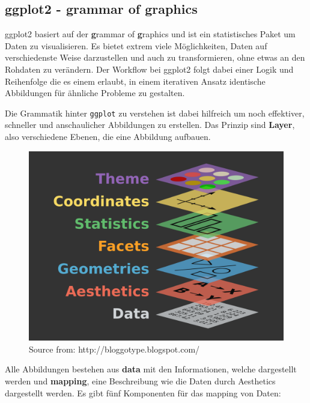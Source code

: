 \documentclass[
]{article}
\begin{document}
\hypertarget{ggplot2---grammar-of-graphics}{%
\subsection{ggplot2 - grammar of graphics}\label{ggplot2---grammar-of-graphics}}

ggplot2 basiert auf der \textbf{g}rammar of \textbf{g}raphics und ist ein statistisches Paket um Daten zu visualisieren. Es bietet extrem viele Möglichkeiten, Daten auf verschiedenste Weise darzustellen und auch zu transformieren, ohne etwas an den Rohdaten zu verändern. Der Workflow bei ggplot2 folgt dabei einer Logik und Reihenfolge die es einem erlaubt, in einem iterativen Ansatz identische Abbildungen für ähnliche Probleme zu gestalten.

Die Grammatik hinter \texttt{ggplot} zu verstehen ist dabei hilfreich um noch effektiver, schneller und anschaulicher Abbildungen zu erstellen. Das Prinzip sind \textbf{Layer}, also verschiedene Ebenen, die eine Abbildung aufbauen.

\begin{figure}

{\centering \includegraphics[width=1\linewidth]{images/051} 

}

\caption{Source from: http://bloggotype.blogspot.com/}\label{fig:unnamed-chunk-171}
\end{figure}

Alle Abbildungen bestehen aus \textbf{data} mit den Informationen, welche dargestellt werden und \textbf{mapping}, eine Beschreibung wie die Daten durch Aesthetics dargestellt werden. Es gibt fünf Komponenten für das mapping von Daten:
\end{document}
